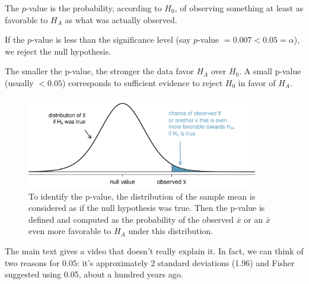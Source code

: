 The $p$-value is the probability, according to $H_0$, of observing something at least as favorable to $H_A$ as what was actually observed.

If the $p$-value is less than the significance level (say $p$-value $=0.007 < 0.05=\alpha$), we reject the null hypothesis.

\begin{termBox}{
The smaller the p-value, the stronger the data favor $H_A$ over $H_0$. A small p-value (usually $<0.05$) corresponds to sufficient evidence to reject $H_0$ in favor of $H_A$.}
\end{termBox}


\begin{figure}%
   \centering
   \includegraphics[width=0.9\textwidth]{ch_inference_foundations/figures/pValueOneSidedSleepStudyExplained/pValueOneSidedSleepStudyExplained}
   \caption{To identify the p-value, the distribution of the sample mean is considered as if the null hypothesis was true. Then the p-value is defined and computed as the probability of the observed $\bar{x}$ or an $\bar{x}$ even more favorable to $H_A$ under this distribution.}
   \label{pValueOneSidedSleepStudyExplained}
\end{figure}

\begin{termBox}{
The main text gives a video that doesn't really explain it. In fact, we can think of two reasons for $0.05$: it's approximately 2 standard deviations (1.96) and Fisher suggested using 0.05, about a hundred years ago.}
\end{termBox}


